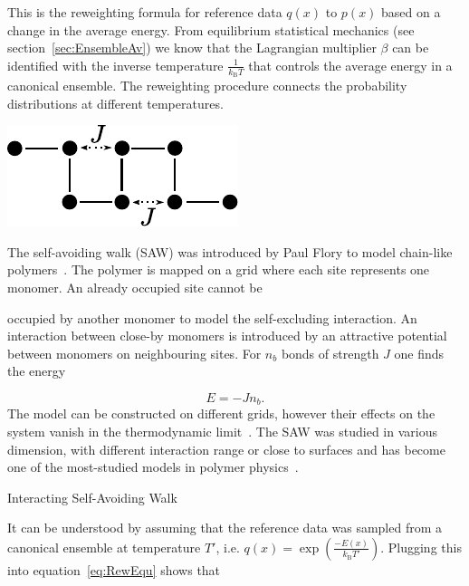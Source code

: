 This is the reweighting formula for reference data $q(x)$ to $p(x)$ based on a change in the average energy. From equilibrium statistical mechanics (see section~\ref{sec:EnsembleAv}) we know that the Lagrangian multiplier $\beta$ can be identified with the inverse temperature  $ \frac{1}{k_{\textrm{B}}T}$ that controls the average energy in a canonical ensemble. The reweighting procedure connects the probability distributions at different temperatures. 
\begin{Technical Point}[t]
\begin{minipage}{0.03\textwidth}
\hfill\vspace{0.1cm}
\end{minipage}%
\begin{minipage}{0.3\textwidth}
    \includegraphics{../images/ISAW.pdf}
\end{minipage}
\hfill
\begin{minipage}{0.65\textwidth}
The self-avoiding walk (SAW) was introduced by Paul Flory to model chain-like polymers~\cite{flory1953principles}. The polymer is mapped on a grid where each site represents one monomer. An already occupied site cannot be \vspace*{0.055cm} \end{minipage} occupied  by another monomer to model the self-excluding interaction. An interaction between close-by monomers is introduced by an attractive potential between monomers on neighbouring sites. For $n_b$ bonds of strength $J$ one finds the energy


\begin{equation}
 E = -J n_b .
\end{equation}
The model can be constructed on different grids, however their effects on the system vanish in the thermodynamic limit~\cite{de1979scaling}. The SAW was studied in various dimension,  with different interaction range or close to surfaces and has become one of the most-studied models in polymer physics~\cite{vanderzande1998lattice}. 
  \caption{Interacting Self-Avoiding Walk}\label{tec:ISAW}
\end{Technical Point}
It can be understood by assuming that the reference data was sampled from a canonical ensemble at temperature $T'$, i.e. $q(x) = \exp \left ( \frac{-E(x)}{k_{\mathrm{B}} T'} \right )$. Plugging this into equation~\ref{eq:RewEqu}  shows that 
